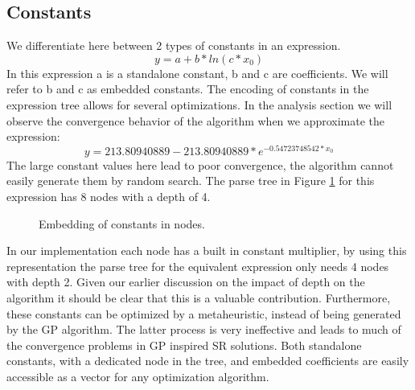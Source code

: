 \documentclass[10pt]{extarticle}
\begin{document}
\subsection{Constants}
We differentiate here between 2 types of constants in an expression.
\[
y = a + b * ln( c * x_0)
\]
In this expression a is a standalone constant, b and c are coefficients. We will refer to b and c as embedded constants.
The encoding of constants in the expression tree allows for several optimizations.
In the analysis section we will observe the convergence behavior of the algorithm when we approximate the expression:
\[
y=213.80940889 - 213.80940889* e^{-0.54723748542*x_0}
\]
The large constant values here lead to poor convergence, the algorithm cannot easily generate them by random search.
The parse tree in Figure \ref{fig:embedconstants} for this expression has 8 nodes with a depth of 4.

\begin{figure}[H]
    \centering
    \qquad
    \caption{Embedding of constants in nodes.}%
    \label{fig:embedconstants}%
\end{figure}
In our implementation each node has a built in constant multiplier, by using this representation the parse tree for the equivalent expression only needs 4 nodes with depth 2. Given our earlier discussion on the impact of depth on the algorithm it should be clear that this is a valuable contribution. Furthermore, these constants can be optimized by a metaheuristic, instead of being generated by the GP algorithm. The latter process is very ineffective and leads to much of the convergence problems in GP inspired SR solutions. 
Both standalone constants, with a dedicated node in the tree, and embedded coefficients are easily accessible as a vector for any optimization algorithm.
\end{document}
